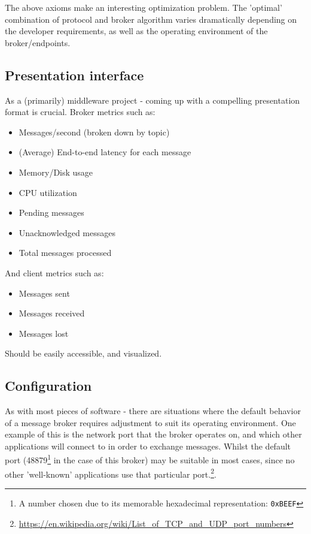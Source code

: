 The above axioms make an interesting optimization problem. The 'optimal' combination
of protocol and broker algorithm varies dramatically depending on the developer
requirements, as well as the operating environment of the broker/endpoints.

\subsection{Presentation interface}
\label{sub:Presentation interface}

As a (primarily) middleware project - coming up with a compelling presentation
format is crucial. Broker metrics such as:

\begin{itemize}
  \item Messages/second (broken down by topic)
  \item (Average) End-to-end latency for each message
  \item Memory/Disk usage
  \item CPU utilization
  \item Pending messages
  \item Unacknowledged messages
  \item Total messages processed
\end{itemize}

And client metrics such as:

\begin{itemize}
  \item Messages sent
  \item Messages received
  \item Messages lost
\end{itemize}

Should be easily accessible, and visualized.

\subsection{Configuration}
\label{sub:Configuration}

As with most pieces of software - there are situations where the default behavior of a message broker requires adjustment to suit its operating environment. One example of this is the network port that the broker operates on, and which other applications will connect to in order to exchange messages. Whilst the default port (48879\footnote{A number chosen due to its memorable hexadecimal representation: \texttt{0xBEEF}} in the case of this broker) may be suitable in most cases, since no other 'well-known' applications use that particular port.\footnote{\url{https://en.wikipedia.org/wiki/List_of_TCP_and_UDP_port_numbers}}.

